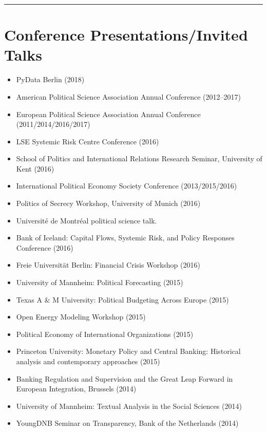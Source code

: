 \documentclass[a4paper]{article}
\begin{document}
\vspace{0.25cm}
\medskip\hrule height 1pt
\vspace{0.5cm}

\section*{Conference Presentations/Invited Talks}

\begin{itemize}
    \item PyData Berlin (2018)
    \item American Political Science Association Annual Conference (2012--2017)
    \item European Political Science Association Annual Conference (2011/2014/2016/2017)
    \item LSE Systemic Risk Centre Conference (2016)
    \item School of Politics and International Relations Research Seminar, University of Kent (2016)
    \item International Political Economy Society Conference (2013/2015/2016)
    \item Politics of Secrecy Workshop, University of Munich (2016)
    \item Universit\'{e} de Montr\'{e}al political science talk.
    \item Bank of Iceland: Capital Flows, Systemic Risk, and Policy Responses Conference (2016)
    \item Freie Universit\"{a}t Berlin: Financial Crisis Workshop (2016)
    \item University of Mannheim: Political Forecasting (2015)
    \item Texas A \& M University: Political Budgeting Across Europe (2015)
    \item Open Energy Modeling Workshop (2015)
    \item Political Economy of International Organizations (2015)
    \item Princeton University: Monetary Policy and Central Banking: Historical analysis and contemporary approaches (2015)
    \item Banking Regulation and Supervision and the Great Leap Forward in European Integration, Brussels (2014)
    \item University of Mannheim: Textual Analysis in the Social Sciences (2014)
    \item YoungDNB Seminar on Transparency, Bank of the Netherlands (2014)

\end{itemize}
\end{document}
